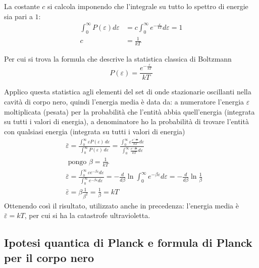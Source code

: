 La costante $c$ si calcola imponendo che l'integrale su tutto lo spettro di energie sia pari a $1$:
\begin{equation}
\begin{split}
\int_{0}^{\infty} P(\varepsilon) d\varepsilon & = c \int_{0}^{\infty} e^{ -\frac{\varepsilon}{kT } } d\varepsilon = 1 \\
c & = \frac{ 1}{kT }
\end{split}
\end{equation}

Per cui si trova la formula che descrive la statistica classica di Boltzmann 
\begin{equation}
P(\varepsilon) = \frac{ e^{ - \frac{\varepsilon}{kT } } }{kT }
\end{equation}

Applico questa statistica agli elementi del set di onde stazionarie oscillanti nella cavità di corpo nero, quindi l'energia media è data da: 
a numeratore l'energia $\varepsilon$ moltiplicata (pesata) per la probabilità che l'entità abbia quell'energia (integrata su tutti i valori di energia), 
a denominatore ho la probabilità di trovare l'entità con qualsiasi energia (integrata su tutti i valori di energia)
\begin{equation}
\begin{split}
& \bar\varepsilon=\frac{\int_{0}^{\infty} \varepsilon P(\varepsilon)\,d\varepsilon}{\int_{0}^{\infty} P(\varepsilon)\,d\varepsilon} = \frac{\int_{0}^{\infty} \varepsilon \frac{ e^{ - \frac{\varepsilon}{kT } } }{kT } d\varepsilon}{\int_{0}^{\infty} \frac{ e^{ - \frac{\varepsilon}{kT } } }{kT }d\varepsilon} \\
& \mbox{ pongo } \beta=\frac{1}{kT} \\
& \bar\varepsilon= \frac{\int_{0}^{\infty} \varepsilon e^{ - \beta \varepsilon } d\varepsilon}{\int_{0}^{\infty} e^{ - \beta \varepsilon } d\varepsilon} = - \frac{ d}{d\beta } \ln \int_0^{\infty} e^{ -\beta \varepsilon } d\varepsilon = - \frac{ d}{d\beta } \ln \frac{ 1}{\beta } \\
& \bar\varepsilon= \beta \frac{ 1}{\beta^2 } = \frac{ 1}{\beta } = kT
\end{split}
\label{energia_media_blackbody}
\end{equation}
Ottenendo così il risultato, utilizzato anche in precedenza: l'energia media è $\bar \varepsilon = kT$, per cui si ha la catastrofe ultravioletta.

\subsection{Ipotesi quantica di Planck e formula di Planck per il corpo nero}

